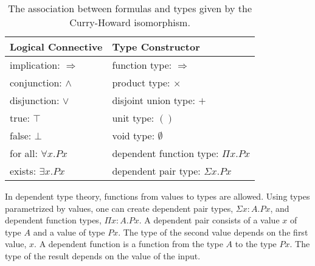 \documentclass{elsarticle}
\newcommand{\tmstrong}[1]{\textbf{#1}}
\begin{document}
\begin{table}[h]\begin{center}
  \begin{tabular}{|l|l|}
    \hline
    {\tmstrong{Logical Connective}} & {\tmstrong{Type Constructor}}\\
    \hline
    implication: $\Rightarrow$ & function type: $\Rightarrow$\\
    \hline
    conjunction: $\wedge$ & product type: $\times$\\
    \hline
    disjunction: $\vee$ & disjoint union type: $+$\\
    \hline
    true: $\top$ & unit type: $()$\\
    \hline
    false: $\bot$ & void type: $\emptyset$\\
    \hline
    for all: $\forall x. P x$ & dependent function type: $\Pi x. P x$\\
    \hline
    exists: $\exists x. P x$ & dependent pair type: $\Sigma x. P x$\\
    \hline
  \end{tabular}\end{center}
  \caption{\label{C-H}The association between formulas and types given by the
  Curry-Howard isomorphism.}
\end{table}

In dependent type theory, functions from values to types are allowed. Using
types parametrized by values, one can create dependent pair types, $\Sigma x :
A. P x$, and dependent function types, $\Pi x : A. P x$. A dependent pair
consists of a value $x$ of type $A$ and a value of type $P x$. The type of the
second value depends on the first value, $x$. A dependent function is a
function from the type $A$ to the type $P x$. The type of the result depends
on the value of the input.
\end{document}

